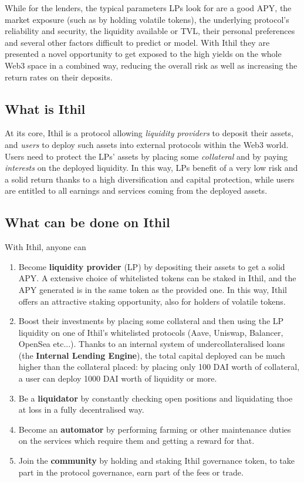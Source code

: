 \documentclass[a4paper,10 pt]{article}
\theoremstyle{definition}
\begin{document}
While for the lenders, the typical parameters LPs look for are a good APY, the market exposure (such as by holding volatile tokens), the underlying protocol's reliability and security, the liquidity available or TVL, their personal preferences and several other factors difficult to predict or model.
With Ithil they are presented a novel opportunity to get exposed to the high yields on the whole Web3 space in a combined way, reducing the overall risk as well as increasing the return rates on their deposits.

\subsection{What is Ithil}

At its core, Ithil is a protocol allowing {\it liquidity providers} to deposit their assets, and {\it users} to deploy such assets into external protocols within the Web3 world. Users need to protect the LPs' assets by placing some {\it collateral} and by paying {\it interests} on the deployed liquidity. 
In this way, LPs benefit of a very low risk and a solid return thanks to a high diversification and capital protection, while users are entitled to all earnings and services coming from the deployed assets.

\subsection{What can be done on Ithil}
With Ithil, anyone can
\begin{enumerate}
\item Become {\bf liquidity provider} (LP) by depositing their assets to get a solid APY. A extensive choice of whitelisted tokens can be staked in Ithil, and the APY generated is in the same token as the provided one. In this way, Ithil offers an attractive staking opportunity, also for holders of volatile tokens.
\item Boost their investments by placing some collateral and then using the LP liquidity on one of Ithil's whitelisted protocols (Aave, Uniswap, Balancer, OpenSea etc...). Thanks to an internal system of undercollateralised loans (the {\bf Internal Lending Engine}), the total capital deployed can be much higher than the collateral placed: by placing only 100 DAI worth of collateral, a user can deploy 1000 DAI worth of liquidity or more.
\item Be a {\bf liquidator} by constantly checking open positions and liquidating thoe at loss in a fully decentralised way.
\item Become an {\bf automator} by performing farming or other maintenance duties on the services which require them and getting a reward for that.
\item Join the {\bf community} by holding and staking Ithil governance token, to take part in the protocol governance, earn part of the fees or trade.
\end{enumerate}
\end{document}

